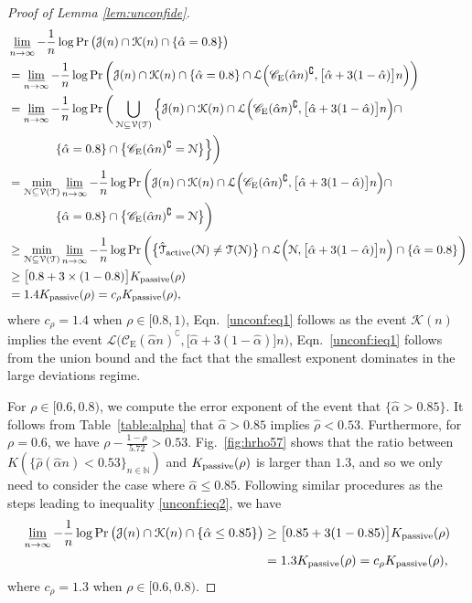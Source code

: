 \documentclass[11pt,onecolumn]{article}
\newcommand{\calJ}{\mathcal{J}}
\newcommand{\calK}{\mathcal{K}}
\newcommand{\calL}{\mathcal{L}}
\newcommand{\calN}{\mathcal{N}}
\newcommand{\calT}{\mathcal{T}}
\newcommand{\calV}{\mathcal{V}}
\newcommand{\hatcalT}{\hat{\calT}}
\newcommand{\bbN}{\mathbb{N}}
\newcommand{\scC}{\mathscr{C}}
\newcommand{\halpha}{\hat{\alpha}}
\newcommand{\hrho}{\hat{\rho}}
\newcommand{\Passive}{{\rm passive}}
\newcommand{\Active}{{\rm active}}
\begin{document}
\begin{proof}[Proof of Lemma \ref{lem:unconfide}]
\begin{align}
		&\varliminf_{n\rightarrow\infty}-\frac{1}{n}\log\Pr\big(\calJ(n)\cap \calK(n)\cap\{ \halpha=0.8\}\big)\nonumber\\*
		&=\varliminf_{n\rightarrow\infty}-\frac{1}{n}\log\Pr\bigg(\calJ(n)\cap \calK(n)\cap\{ \halpha=0.8\}\cap \calL\Big(\scC_{\mathrm{E}}(\halpha n)^{\complement},\big[\halpha+3(1-\halpha)\big]n\Big)\bigg)\label{unconf:eq1}\\
		&=\varliminf_{n\rightarrow\infty}-\frac{1}{n}\log\Pr\bigg(\bigcup_{\calN\subseteq \calV(\calT)} \Big\{\calJ(n)\cap \calK(n)\cap \calL\Big(\scC_{\mathrm{E}}(\halpha n)^{\complement},\big[\halpha+3(1-\halpha)\big]n\Big) \cap\nonumber\\*
		&\qquad\qquad \{ \halpha=0.8\} \cap\big\{\scC_{\mathrm{E}}(\halpha n)^{\complement}=\calN\big\}\Big\}\bigg)\\
		&=\min_{\calN\subseteq \calV(\calT)}\varliminf_{n\rightarrow\infty}-\frac{1}{n}\log\Pr\bigg(\calJ(n)\cap \calK(n)\cap \calL\Big(\scC_{\mathrm{E}}(\halpha n)^{\complement},\big[\halpha+3(1-\halpha)\big]n\Big) \cap\nonumber\\*
		&\qquad\qquad\{ \halpha=0.8\} \cap\big\{\scC_{\mathrm{E}}(\halpha n)^{\complement}=\calN\big\}\bigg)\label{unconf:ieq1}\\
		&\geq \min_{\calN\subseteq \calV(\calT)}\varliminf_{n\rightarrow\infty}-\frac{1}{n}\log\Pr\bigg(\big\{\hatcalT_{\Active}(\calN)\neq\calT(\calN)\big\}\cap \calL\Big(\calN,\big[\halpha+3(1-\halpha)\big]n\Big) \cap \{ \halpha=0.8\}\bigg)\\
		&\geq \big[0.8+3\times(1-0.8)\big]K _{\Passive}(\rho)\\*
		&=1.4K _{\Passive}(\rho)= c_{\rho}K _{\Passive}(\rho), \label{unconf:ieq2}
	\end{align}
	where $c_{\rho}=1.4$ when $\rho\in[0.8,1)$, Eqn.~\eqref{unconf:eq1} follows as the event $\calK(n)$ implies the event $\calL\big(\scC_{\mathrm{E}}(\halpha n)^{\complement},\big[\halpha+3(1-\halpha)\big]n\big)$, Eqn.~\eqref{unconf:ieq1} follows  from the union bound and the fact that the smallest exponent dominates in the large deviations regime. 

	For $\rho\in [0.6,0.8)$, we compute the error exponent of the event that $\{\halpha >0.85\}$. It follows from Table~\ref{table:alpha} that $\halpha >0.85$ implies $\hrho<0.53$. Furthermore, for $\rho=0.6$, we have $\rho-\frac{1-\rho}{5.72}> 0.53$. Fig.~\ref{fig:hrho57} shows that the ratio between $K(\{\hrho(\halpha n)<0.53\}_{n\in\bbN})$ and $K_{\Passive}(\rho)$ is larger than $1.3$, and so we only need to consider the case where $\halpha \leq 0.85$. Following similar procedures as the steps leading to inequality \eqref{unconf:ieq2}, we have
	\begin{align}
		\varliminf_{n\rightarrow\infty}-\frac{1}{n}\log\Pr\big(\calJ(n)\cap \calK(n)\cap \{\halpha \leq 0.85\}\big)
		&\geq \big[0.85+3(1-0.85)\big]K _{\Passive}(\rho)\\*
		&=1.3K _{\Passive}(\rho)=c_{\rho}K _{\Passive}(\rho),
	\end{align}
	where $c_{\rho}=1.3$ when $\rho\in[0.6,0.8)$.


\end{proof}
\end{document}

